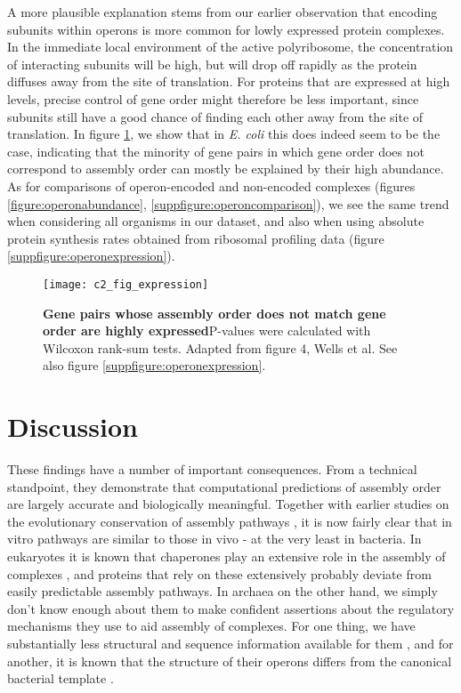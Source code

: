 \documentclass[a4paper,11pt,twoside,openright]{scrbook}
\begin{document}
A more plausible explanation stems from our earlier observation that encoding subunits within operons is more common for lowly expressed protein complexes. In the immediate local environment of the active polyribosome, the concentration of interacting subunits will be high, but will drop off rapidly as the protein diffuses away from the site of translation. For proteins that are expressed at high levels, precise control of gene order might therefore be less important, since subunits still have a good chance of finding each other away from the site of translation. In figure \ref{figure:operonexpression}, we show that in \textit{E. coli} this does indeed seem to be the case, indicating that the minority of gene pairs in which gene order does not correspond to assembly order can mostly be explained by their high abundance. As for comparisons of operon-encoded and non-encoded complexes (figures \ref{figure:operonabundance}, \ref{suppfigure:operoncomparison}), we see the same trend when considering all organisms in our dataset, and also when using absolute protein synthesis rates obtained from ribosomal profiling data (figure \ref{suppfigure:operonexpression}).

\begin{figure}[h]
\fcapsideright
    {\caption[Gene pairs whose assembly order does not match gene order are highly expressed]{\sffamily\textbf{Gene pairs whose assembly order does not match gene order are highly expressed}\newline \small P-values were calculated with Wilcoxon rank-sum tests. Adapted from figure 4, Wells et al. \cite{Wells2016} See also figure \ref{suppfigure:operonexpression}.}\label{figure:operonexpression}}
    {\texttt{[image: c2\_fig\_expression]}}
\end{figure}

\section{Discussion}
These findings have a number of important consequences. From a technical standpoint, they demonstrate that computational predictions of assembly order are largely accurate and biologically meaningful. Together with earlier studies on the evolutionary conservation of assembly pathways \cite{Levy2008,Marsh2013}, it is now fairly clear that in vitro pathways are similar to those in vivo - at the very least in bacteria. In eukaryotes it is known that chaperones play an extensive role in the assembly of complexes \cite{Ellis2006}, and proteins that rely on these extensively probably deviate from easily predictable assembly pathways. In archaea on the other hand, we simply don't know enough about them to make confident assertions about the regulatory mechanisms they use to aid assembly of complexes. For one thing, we have substantially less structural and sequence information available for them \cite{Mukherjee2017}, and for another, it is known that the structure of their operons differs from the canonical bacterial template \cite{Koide2009}.
\end{document}
